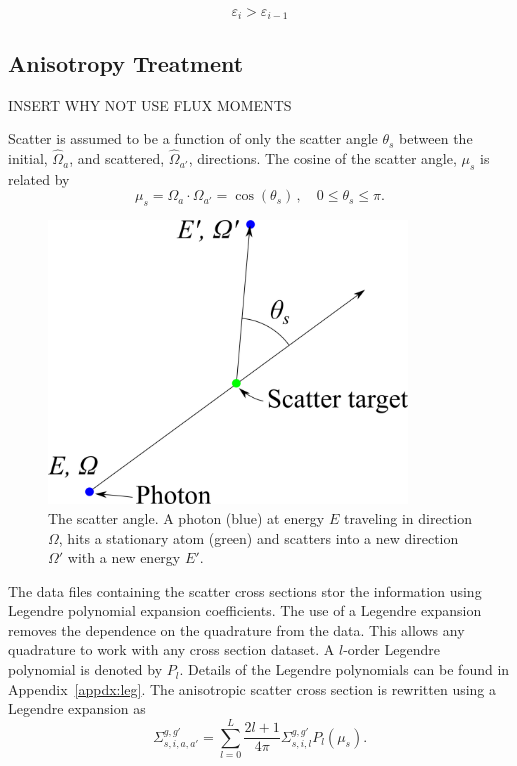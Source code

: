 \begin{equation}\label{eq:conv4}
\varepsilon_i > \varepsilon_{i-1}
\end{equation}

\subsection{Anisotropy Treatment}\label{sec:aniso}

INSERT WHY NOT USE FLUX MOMENTS

Scatter is assumed to be a function of only the scatter angle $\theta_s$ between the initial, $\hat{\Omega}_a$, and scattered, $\hat{\Omega}_{a'}$, directions. The cosine of the scatter angle, $\mu_s$ is related by 
\begin{equation} \label{eq:scat_cos}
\mu_s = \Omega_a \cdot \Omega_{a'} = \cos(\theta_s) \,, \quad 0 \leq \theta_s \leq \pi.
\end{equation}

\begin{figure}[tb]
  \begin{center}
   \includegraphics[width=3.75in]{figs/scat_ang}
  \end{center}
  \caption{The scatter angle. A photon (blue) at energy $E$ traveling in direction $\Omega$, hits a stationary atom (green) and scatters into a new direction $\Omega'$ with a new energy $E'$.}
\label{fig:scat_ang}
\end{figure}%

The data files containing the scatter cross sections stor the information using Legendre polynomial expansion coefficients. The use of a Legendre expansion removes the dependence on the quadrature from the data. This allows any quadrature to work with any cross section dataset. A $l$-order Legendre polynomial is denoted by $P_l$. Details of the Legendre polynomials can be found in Appendix~\ref{appdx:leg}. The anisotropic scatter cross section is rewritten using a Legendre expansion as
\begin{equation} \label{eq:leg_1}
\Sigma_{s, i, a, a'}^{g, g'} = \sum_{l=0}^L \frac{2l+1}{4 \pi}\Sigma_{s, i, l}^{g, g'} P_l(\mu_s).
\end{equation}

